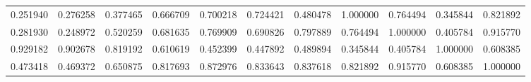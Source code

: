 \begin{table}
\begin{tabular}{lcr}
0.251940 & 0.276258 & 0.377465 & 0.666709 & 0.700218 & 0.724421 & 0.480478 & 1.000000 & 0.764494 & 0.345844 & 0.821892 \\
0.281930 & 0.248972 & 0.520259 & 0.681635 & 0.769909 & 0.690826 & 0.797889 & 0.764494 & 1.000000 & 0.405784 & 0.915770 \\
0.929182 & 0.902678 & 0.819192 & 0.610619 & 0.452399 & 0.447892 & 0.489894 & 0.345844 & 0.405784 & 1.000000 & 0.608385 \\
0.473418 & 0.469372 & 0.650875 & 0.817693 & 0.872976 & 0.833643 & 0.837618 & 0.821892 & 0.915770 & 0.608385 & 1.000000 \\
\bottomrule
\end{tabular}
\end{table}
